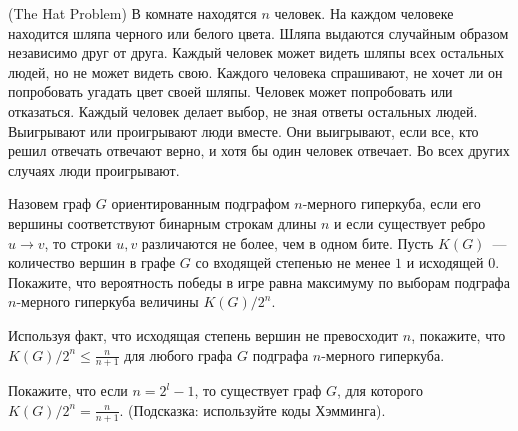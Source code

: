 (The Hat Problem) В комнате находятся $n$ человек. На каждом человеке находится шляпа черного или белого цвета. Шляпа
выдаются случайным образом независимо друг от друга. Каждый человек может видеть шляпы всех остальных людей, но не может
видеть свою. Каждого человека спрашивают, не хочет ли он попробовать угадать цвет своей шляпы. Человек может попробовать или
отказаться. Каждый человек делает выбор, не зная ответы остальных людей. Выигрывают или проигрывают люди вместе. Они
выигрывают, если все, кто решил отвечать отвечают верно, и хотя бы один человек отвечает. Во всех других случаях люди
проигрывают.
\begin{enumcyr}
    \item Назовем граф $G$ ориентированным подграфом $n$-мерного гиперкуба, если его вершины соответствуют бинарным строкам
	    длины $n$ и если существует ребро $u \rightarrow v$, то строки $u, v$ различаются не более, чем в одном бите. Пусть
        $K(G)$~--- количество вершин в графе $G$ со входящей степенью не менее $1$ и исходящей $0$. Покажите, что вероятность
        победы в игре равна максимуму по выборам подграфа $n$-мерного гиперкуба величины $K(G) / 2^n$.
    \item Используя факт, что исходящая степень вершин не превосходит $n$, покажите, что $K(G) / 2^n \le \frac{n}{n + 1}$ для
	    любого графа $G$ подграфа $n$-мерного гиперкуба.
    \item Покажите, что если $n = 2^l - 1$, то существует граф $G$, для которого $K(G) / 2^n = \frac{n}{n + 1}$. (Подсказка:
	    используйте коды Хэмминга).
\end{enumcyr}